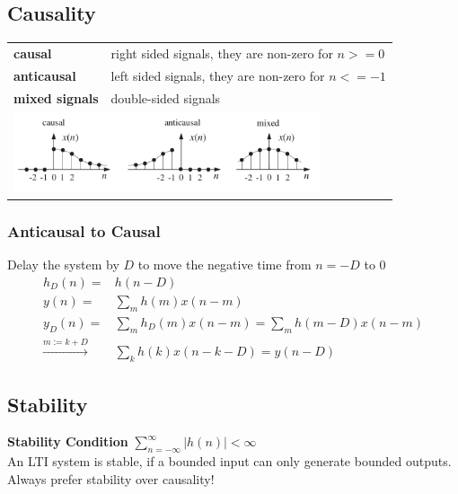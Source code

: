 \begin{multicols}{2}
\subsection{Causality}
\begin{tabular}{lp{4.5cm}}
	\textbf{causal} & right sided signals, they are non-zero for $n>=0$ \\
	\textbf{anticausal} & left sided signals, they are non-zero for $n<=-1$ \\
	\textbf{mixed signals} & double-sided signals \\
	\multicolumn{2}{l}{\includegraphics[width=9cm]{./picture/causality}}\\
\end{tabular}

\columnbreak

\subsubsection{Anticausal to Causal}
Delay the system by $D$ to move the negative time from $n=-D$ to $0$
\begin{align*}
h_D(n) =& h(n-D)\\
y(n) =& \sum\limits_{m}h(m)x(n-m) \\
y_D(n) = & \sum\limits_{m}h_D(m)x(n-m) = \sum\limits_{m}h(m-D)x(n-m) \\ 
\xrightarrow{m := k+D}& \sum\limits_{k}h(k)x(n-k-D) = y(n-D)
\end{align*}
\end{multicols}



\subsection{Stability}
\textbf{Stability Condition} $\sum\limits_{n=-\infty}^{\infty}\left| h(n)
\right| < \infty$\\
An LTI system is stable, if a bounded input can only generate bounded outputs.
Always prefer stability over causality!
